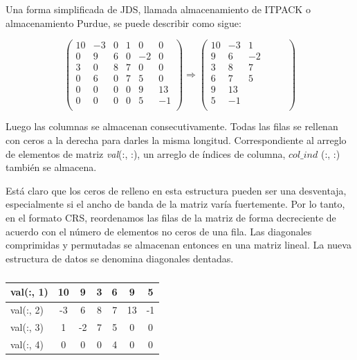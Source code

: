 \documentclass[a4paper,openright,12pt, oneside]{book}
\newcommand{\implica}{\Rightarrow}
\begin{document}
Una forma simplificada de JDS, llamada almacenamiento de ITPACK o almacenamiento Purdue, se puede describir como sigue:

\begin{equation}
\left(
\begin{array}{cccccc}
 
10& -3& 0& 1& 0& 0\\
0&   9& 6& 0& -2& 0 \\
3&   0& 8& 7& 0& 0 \\
0&   6& 0& 7& 5& 0 \\
0&   0& 0& 0& 9& 13 \\
0&   0& 0& 0& 5& -1 \\
\end{array}
\right)
\implica
\left(
\begin{array}{cccccc}
 
10& -3& 1&  &  & \\
9& 6& -2& &  & \\
3& 8& 7& &  & \\
6& 7& 5& &  & \\
9& 13 & &  & \\
5& -1 & &  &\\
\end{array}
\right)
\end{equation}

Luego las columnas se almacenan consecutivamente. Todas las filas se rellenan con ceros a la derecha para darles la misma longitud. Correspondiente al arreglo de elementos de matriz \textit{val}(:, :), un arreglo de \'indices de columna, $col\_ind$ (:, :) tambi\'en se almacena.

Est\'a claro que los ceros de relleno en esta estructura pueden ser una desventaja, especialmente si el ancho de banda de la matriz var\'ia fuertemente. Por lo tanto, en el formato CRS, reordenamos las filas de la matriz de forma decreciente de acuerdo con el n\'umero de elementos no ceros de una fila. Las diagonales comprimidas y permutadas se almacenan entonces en una matriz lineal. La nueva estructura de datos se denomina diagonales dentadas.



\begin{table}[htdp]
    
    \centering
    \begin{tabular}{ | l || c | c | c | c | c | c |}
      \hline
      val(:, 1) & 10 & 9 & 3 & 6 & 9 & 5 \\ \hline 
      val(:, 2) & -3 & 6 & 8 & 7 & 13 & -1 \\ \hline
      val(:, 3) & 1 & -2 & 7 & 5 & 0 & 0 \\ \hline
      val(:, 4) & 0 & 0 & 0 & 4 & 0 & 0 \\ \hline 
    \end{tabular}
    \caption{}
\end{table}
\end{document}
